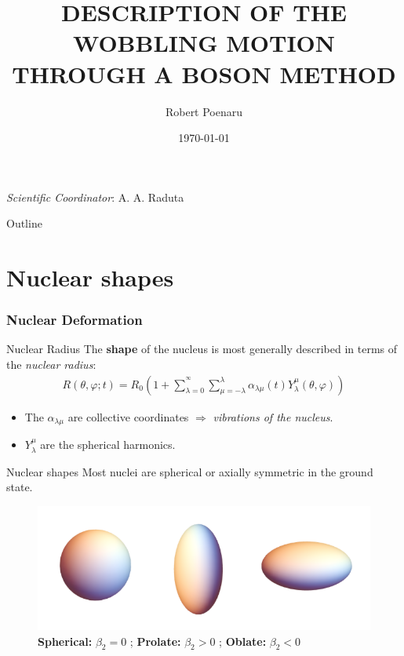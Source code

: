 \documentclass{beamer}
\title[presentation]{DESCRIPTION OF THE WOBBLING MOTION THROUGH A BOSON METHOD}
\author{Robert Poenaru}
\institute{DFT, IFIN-HH\\Doctoral School of Physics, UB}
\date{\today}
\begin{document}
\begin{frame}
  \titlepage
  \vspace{1em}\emph{Scientific Coordinator}: A. A. Raduta
\end{frame}

\begin{frame}{Outline}
 \tableofcontents
\end{frame}

\section{Nuclear shapes}

\begin{frame}
  \frametitle{Nuclear Deformation}

  \begin{exampleblock}{Nuclear Radius}
    The \textbf{shape} of the nucleus is most generally described in terms of the \emph{nuclear radius}:
    \begin{align}
      R(\theta,\varphi;t)=R_0\left(1+\sum_{\lambda=0}^{^\infty}\sum_{\mu=-\lambda}^\lambda\alpha_{\lambda\mu}(t)Y_\lambda^\mu(\theta,\varphi)\right)
    \end{align}
  \end{exampleblock}
\begin{itemize}
  \item The $\alpha_{\lambda\mu}$ are collective coordinates $\Longrightarrow$ \emph{vibrations of the nucleus}.
  \item $Y_\lambda^\mu$ are the spherical harmonics.
\end{itemize}
\end{frame}


\begin{frame}{Nuclear shapes}
  Most nuclei are spherical or axially symmetric in the ground state.
    \begin{figure}
      \centering
      \includegraphics[scale=0.4]{figures/nuclear_shapes.png}
      \caption{\textbf{Spherical:} $\beta_2=0$ ; \textbf{Prolate:} $\beta_2>0$ ; \textbf{Oblate:} $\beta_2<0$}
    \end{figure}
  \end{frame}
\end{document}

